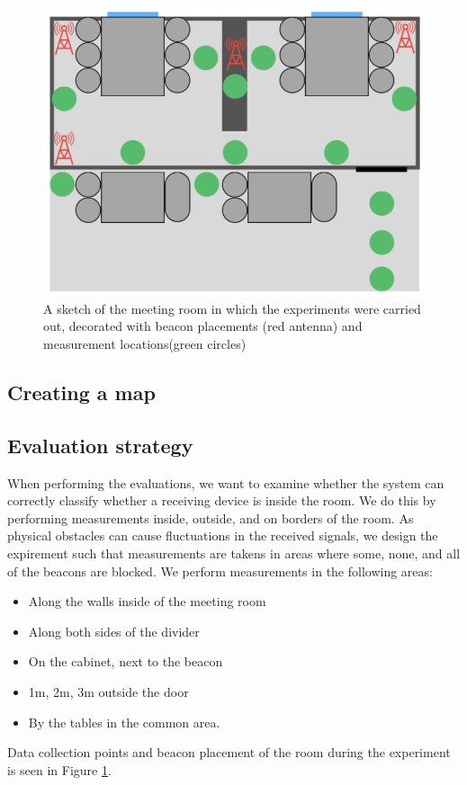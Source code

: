\begin{figure}[h]
    \centering
    \includegraphics[scale=0.7]{images/experiment_setup.png}
    \caption{A sketch of the meeting room in which the experiments were carried out, decorated with beacon placements (red antenna) and measurement locations(green circles)}
    \label{fig:experiment_setup}
\end{figure}

\subsection{Creating a map}




\subsection{Evaluation strategy}
When performing the evaluations, we want to examine whether the system can correctly classify whether a receiving device is inside the room.
We do this by performing measurements inside, outside, and on borders of the room.
As physical obstacles can cause fluctuations in the received signals, we design the expirement such that measurements are takens in areas where some, none, and all of the beacons are blocked. 
We perform measurements in the following areas:
\begin{itemize}
    \item Along the walls inside of the meeting room
    \item Along both sides of the divider
    \item On the cabinet, next to the beacon
    \item 1m, 2m, 3m outside the door
    \item By the tables in the common area. 
\end{itemize}
Data collection points and beacon placement of the room during the experiment is seen in Figure \ref{fig:experiment_setup}.
